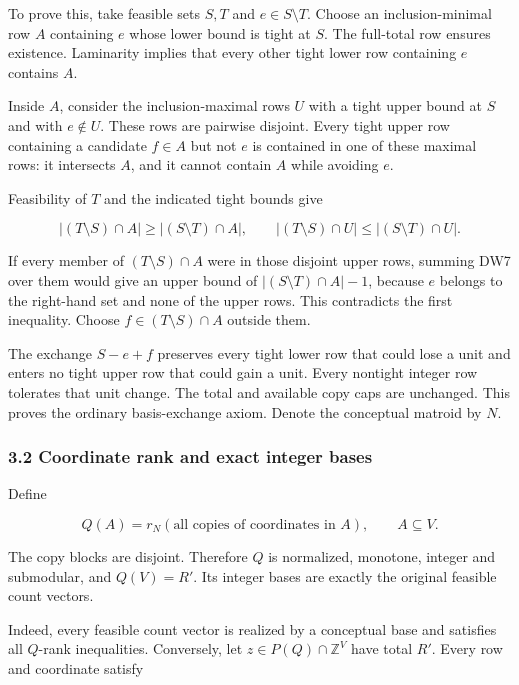 To prove this, take feasible sets \(S,T\) and \(e\in S\setminus T\). Choose an inclusion-minimal row \(A\) containing \(e\) whose lower bound is tight at \(S\). The full-total row ensures existence. Laminarity implies that every other tight lower row containing \(e\) contains \(A\).

Inside \(A\), consider the inclusion-maximal rows \(U\) with a tight upper bound at \(S\) and with \(e\notin U\). These rows are pairwise disjoint. Every tight upper row containing a candidate \(f\in A\) but not \(e\) is contained in one of these maximal rows: it intersects \(A\), and it cannot contain \(A\) while avoiding \(e\).

Feasibility of \(T\) and the indicated tight bounds give

\[
|(T\setminus S)\cap A|\ge |(S\setminus T)\cap A|,
\qquad
|(T\setminus S)\cap U|\le |(S\setminus T)\cap U|.
\tag{DW7}
\]

If every member of \((T\setminus S)\cap A\) were in those disjoint upper rows, summing DW7 over them would give an upper bound of \(|(S\setminus T)\cap A|-1\), because \(e\) belongs to the right-hand set and none of the upper rows. This contradicts the first inequality. Choose \(f\in(T\setminus S)\cap A\) outside them.

The exchange \(S-e+f\) preserves every tight lower row that could lose a unit and enters no tight upper row that could gain a unit. Every nontight integer row tolerates that unit change. The total and available copy caps are unchanged. This proves the ordinary basis-exchange axiom. Denote the conceptual matroid by \(N\).

\hypertarget{af-fe230a140d-coordinate-rank-and-exact-integer-bases}{%
\subsubsection{3.2 Coordinate rank and exact integer bases}\label{af-fe230a140d-coordinate-rank-and-exact-integer-bases}}

Define

\[
Q(A)=r_N(\text{all copies of coordinates in }A),
\qquad A\subseteq V.
\tag{DW8}
\]

The copy blocks are disjoint. Therefore \(Q\) is normalized, monotone, integer and submodular, and \(Q(V)=R'\). Its integer bases are exactly the original feasible count vectors.

Indeed, every feasible count vector is realized by a conceptual base and satisfies all \(Q\)-rank inequalities. Conversely, let \(z\in P(Q)\cap\mathbb Z^V\) have total \(R'\). Every row and coordinate satisfy

